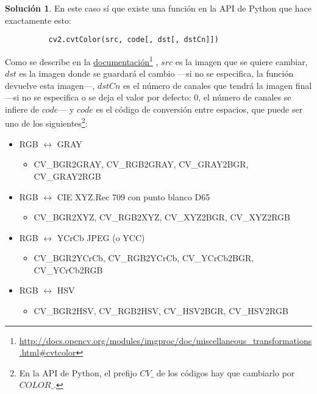 \documentclass[a4paper, 11pt]{article}
\newcommand\fnurl[2]{%
  \href{#2}{#1}\footnote{\url{#2}}%
}
\theoremstyle{definition}
\newtheorem*{solucion}{Solución}
\begin{document}
  \begin{solucion}
      En este caso sí que existe una función en la API de Python que hace exactamente esto:

      \begin{lstlisting}
          cv2.cvtColor(src, code[, dst[, dstCn]])
      \end{lstlisting}

      Como se describe en la \fnurl{documentación}{http://docs.opencv.org/modules/imgproc/doc/miscellaneous_transformations.html\#cvtcolor}, $src$ es la imagen que se quiere cambiar, $dst$ es la imagen donde se guardará el cambio ---si no se especifica, la función devuelve esta imagen---, $dstCn$ es el número de canales que tendrá la imagen final ---si no se especifica o se deja el valor por defecto: 0, el número de canales se infiere de $code$--- y $code$ es el código de conversión entre espacios, que puede ser uno de los siguientes\footnote{En la API de Python, el prefijo $CV\_$ de los códigos hay que cambiarlo por $COLOR\_$.}:

      \begin{itemize}
          \item RGB $\leftrightarrow$ GRAY
              \begin{itemize}
                  \item CV\_BGR2GRAY, CV\_RGB2GRAY, CV\_GRAY2BGR, CV\_GRAY2RGB
              \end{itemize}


          \item RGB $\leftrightarrow$ CIE XYZ.Rec 709 con punto blanco D65
              \begin{itemize}
                  \item CV\_BGR2XYZ, CV\_RGB2XYZ, CV\_XYZ2BGR, CV\_XYZ2RGB
              \end{itemize}

          \item RGB $\leftrightarrow$ YCrCb JPEG (o YCC)
              \begin{itemize}
                  \item CV\_BGR2YCrCb, CV\_RGB2YCrCb, CV\_YCrCb2BGR, CV\_YCrCb2RGB
              \end{itemize}

          \item RGB $\leftrightarrow$ HSV
              \begin{itemize}
                  \item CV\_BGR2HSV, CV\_RGB2HSV, CV\_HSV2BGR, CV\_HSV2RGB
              \end{itemize}


\end{itemize}
\end{solucion}
\end{document}
